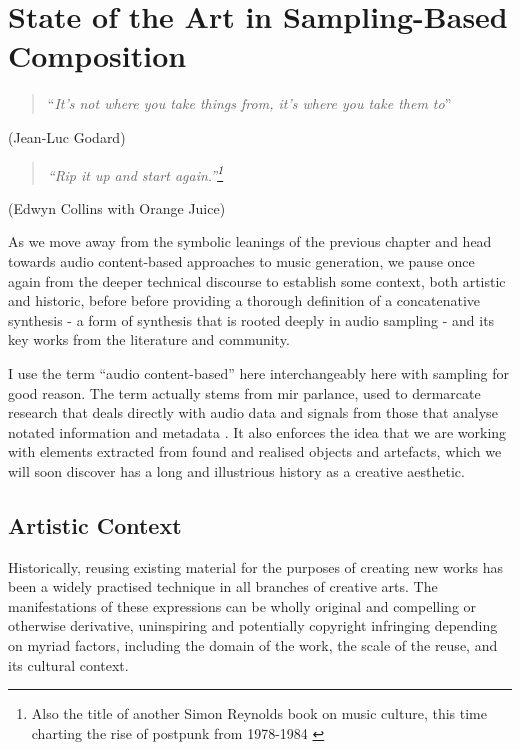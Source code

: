 \chapter{State of the Art in Sampling-Based Composition}
\label{chap:sota}

\blockquote{``\textit{It's not where you take things from, it's where you take them to}''}

\begin{flushright}
(Jean-Luc Godard)
\end{flushright}

\blockquote{\textit{``Rip it up and start again.''\footnote{Also the title of another Simon Reynolds book on music culture, this time charting the rise of postpunk from 1978-1984 \citep{reynolds2009rip}}}}

\begin{flushright}
(Edwyn Collins with Orange Juice)
\end{flushright}

As we move away from the symbolic leanings of the previous chapter and head towards audio content-based approaches to music generation, we pause once again from the deeper technical discourse to establish some context, both artistic and historic, before before providing a thorough definition of a concatenative synthesis - a form of synthesis that is rooted deeply in audio sampling - and its key works from the literature and community.

I use the term ``audio content-based'' here interchangeably here with sampling for good reason. The term actually stems from \acrshort{mir} parlance, used to dermarcate research that deals  directly with audio data and signals from those that analyse notated information and metadata \citep{Veltkamp2008, Casey2008a}. It also enforces the idea that we are working with elements extracted from found and realised objects and artefacts, which we will soon discover has a long and illustrious history as a creative aesthetic.  

\section{Artistic Context}

Historically, reusing existing material for the purposes of creating new works has been a widely practised technique in all branches of creative arts. The manifestations of these expressions can be wholly original and compelling or otherwise derivative, uninspiring and potentially copyright infringing depending on myriad factors, including the domain of the work, the scale of the reuse, and its cultural context.

